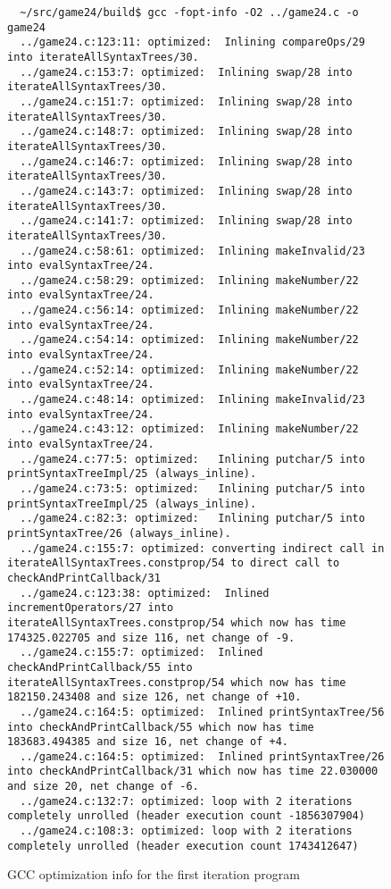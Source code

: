 \documentclass[11pt,a4paper]{article}
\begin{document}
\begin{figure}[h]
  \centering
  \begin{lstlisting}
  ~/src/game24/build$ gcc -fopt-info -O2 ../game24.c -o game24
  ../game24.c:123:11: optimized:  Inlining compareOps/29 into iterateAllSyntaxTrees/30.
  ../game24.c:153:7: optimized:  Inlining swap/28 into iterateAllSyntaxTrees/30.
  ../game24.c:151:7: optimized:  Inlining swap/28 into iterateAllSyntaxTrees/30.
  ../game24.c:148:7: optimized:  Inlining swap/28 into iterateAllSyntaxTrees/30.
  ../game24.c:146:7: optimized:  Inlining swap/28 into iterateAllSyntaxTrees/30.
  ../game24.c:143:7: optimized:  Inlining swap/28 into iterateAllSyntaxTrees/30.
  ../game24.c:141:7: optimized:  Inlining swap/28 into iterateAllSyntaxTrees/30.
  ../game24.c:58:61: optimized:  Inlining makeInvalid/23 into evalSyntaxTree/24.
  ../game24.c:58:29: optimized:  Inlining makeNumber/22 into evalSyntaxTree/24.
  ../game24.c:56:14: optimized:  Inlining makeNumber/22 into evalSyntaxTree/24.
  ../game24.c:54:14: optimized:  Inlining makeNumber/22 into evalSyntaxTree/24.
  ../game24.c:52:14: optimized:  Inlining makeNumber/22 into evalSyntaxTree/24.
  ../game24.c:48:14: optimized:  Inlining makeInvalid/23 into evalSyntaxTree/24.
  ../game24.c:43:12: optimized:  Inlining makeNumber/22 into evalSyntaxTree/24.
  ../game24.c:77:5: optimized:   Inlining putchar/5 into printSyntaxTreeImpl/25 (always_inline).
  ../game24.c:73:5: optimized:   Inlining putchar/5 into printSyntaxTreeImpl/25 (always_inline).
  ../game24.c:82:3: optimized:   Inlining putchar/5 into printSyntaxTree/26 (always_inline).
  ../game24.c:155:7: optimized: converting indirect call in iterateAllSyntaxTrees.constprop/54 to direct call to checkAndPrintCallback/31
  ../game24.c:123:38: optimized:  Inlined incrementOperators/27 into iterateAllSyntaxTrees.constprop/54 which now has time 174325.022705 and size 116, net change of -9.
  ../game24.c:155:7: optimized:  Inlined checkAndPrintCallback/55 into iterateAllSyntaxTrees.constprop/54 which now has time 182150.243408 and size 126, net change of +10.
  ../game24.c:164:5: optimized:  Inlined printSyntaxTree/56 into checkAndPrintCallback/55 which now has time 183683.494385 and size 16, net change of +4.
  ../game24.c:164:5: optimized:  Inlined printSyntaxTree/26 into checkAndPrintCallback/31 which now has time 22.030000 and size 20, net change of -6.
  ../game24.c:132:7: optimized: loop with 2 iterations completely unrolled (header execution count -1856307904)
  ../game24.c:108:3: optimized: loop with 2 iterations completely unrolled (header execution count 1743412647)
  \end{lstlisting}
  \caption[GCC opt-info, iteration 1]{GCC optimization info for the
    first iteration program}
  \label{fig:opt-info-it1}
\end{figure}
\end{document}
